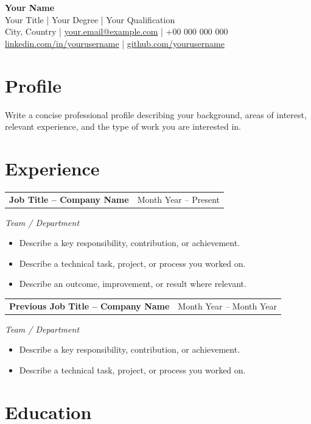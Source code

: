 \documentclass[10pt,a4paper]{article}
\makeatletter
\newcommand{\entry}[2]{
  \vspace{2pt}
  \begin{tabular*}{\textwidth}{@{}l@{\extracolsep{\fill}}r@{}}
    \textbf{#1} & #2 \\
  \end{tabular*}
}
\newcommand{\subentry}[1]{\textit{#1}\vspace{-1pt}}
\makeatother
\begin{document}
\begin{center}
{\LARGE \textbf{Your Name}} \\[3pt]
Your Title \quad | \quad Your Degree \quad | \quad Your Qualification \\[3pt]
City, Country \quad | \quad
\href{mailto:your.email@example.com}{your.email@example.com} \quad | \quad
+00 000 000 000 \\[2pt]
\href{https://www.linkedin.com/in/yourusername}{linkedin.com/in/yourusername}
\quad | \quad
\href{https://github.com/yourusername}{github.com/yourusername}
\end{center}

\vspace{-5pt}

\section*{Profile}

Write a concise professional profile describing your background, areas of interest, relevant experience, and the type of work you are interested in.

\section*{Experience}

\entry{Job Title -- Company Name}{Month Year -- Present}
\subentry{Team / Department}
\begin{itemize}
\item Describe a key responsibility, contribution, or achievement.
\item Describe a technical task, project, or process you worked on.
\item Describe an outcome, improvement, or result where relevant.
\end{itemize}

\entry{Previous Job Title -- Company Name}{Month Year -- Month Year}
\subentry{Team / Department}
\begin{itemize}
\item Describe a key responsibility, contribution, or achievement.
\item Describe a technical task, project, or process you worked on.
\end{itemize}

\section*{Education}
\end{document}
